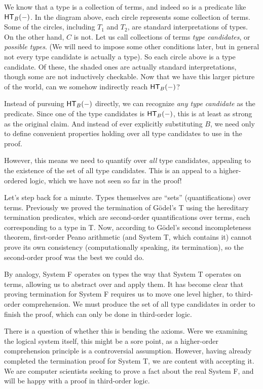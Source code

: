 \documentclass{article}
\begin{document}
We know that a type is a collection of terms, and indeed so is a predicate like
$\mathsf{HT}_{B}(-)$. In the diagram above, each circle represents some collection of terms.
Some of the circles, including $T_1$ and $T_2$, are standard interpretations of types.
On the other hand, $C$ is not. Let us call collections of terms \emph{type candidates}, or
\emph{possible types}. (We will need
to impose some other conditions later, but in general not every type candidate is actually a type).
So each circle above is a type candidate. Of these, the shaded ones are actually standard interpretations,
though some are not inductively checkable. Now that we have this larger picture of the
world, can we somehow indirectly reach $\mathsf{HT}_{B}(-)$?

Instead of pursuing $\mathsf{HT}_{B}(-)$ directly, we can recognize \emph{any type candidate}
as the predicate. Since one of the type candidates is $\mathsf{HT}_{B}(-)$, this is at
least as strong as the original claim. And instead of ever explicitly substituting $B$, we need only
to define convenient properties holding over all type candidates to use in the proof.

However, this means we need to quantify over \emph{all} type candidates, appealing to the existence
of the set of all type candidates. This is an appeal to a higher-ordered logic, which we have not
seen so far in the proof!

Let's step back for a minute. Types themselves are ``sets'' (quantifications) over terms.
Previously we proved the termination of G\"odel's T using the hereditary termination predicates,
which are second-order quantifications over terms, each corresponding to a type in T.
Now, according to G\"odel's second incompleteness theorem, first-order Peano
arithmetic (and System T, which contains it) cannot prove its own consistency (computationally
speaking, its termination), so the second-order proof was the best we could do.

By analogy, System F operates on types the way that System T operates on terms, allowing us to
abstract over and apply them. It has become clear that proving termination for System F requires us
to move one level higher, to third-order comprehension.
We must produce the set of all type candidates in order to finish the proof, which can only be
done in third-order logic.

There is a question of whether this is bending the axioms. Were we examining the
logical system itself, this might be a sore point, as a higher-order comprehension principle is
a controversial assumption. However, having already completed the termination proof for System T,
we are content with accepting it. We are computer scientists seeking to prove a fact about the real
System F, and will be happy with a proof in third-order logic.
\end{document}
